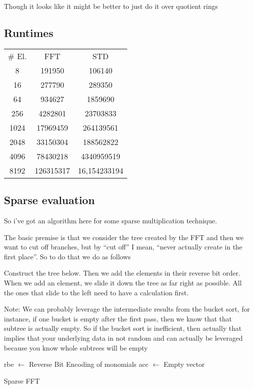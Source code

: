 Though it looks like it might be better to just do it over quotient rings

\subsection{Runtimes}

\begin{center}
    \begin{tabular}{|c| c c|}
        \# El. & FFT & STD\\
        8      & 191950 & 106140 \\
        16     & 277790 & 289350 \\
        64     & 934627 & 1859690 \\
        256    & 4282801 & 23703833 \\
        1024   & 17969459 & 264139561 \\
        2048   & 33150304 & 188562822 \\
        4096   & 78430218 & 4340959519 \\
        8192   & 126315317 & 16,154233194 \\
    \end{tabular}
\end{center}

\subsection{Sparse evaluation}

So i've got an algorithm here for some sparse multiplication technique.

The basic premise is that we consider the tree created by the FFT and then we want to cut off branches, but by ``cut off'' I mean, ``never actually create in the first place''. So to do that we do as follows

Construct the tree below.
Then we add the elements in their reverse bit order. When we add an element, we slide it down the tree as far right as possible. All the ones that slide to the left need to have a calculation first.

Note: We can probably leverage the intermediate results from the bucket sort, for instance, if one bucket is empty after the first pass, then we know that that subtree is actually empty. So if the bucket sort is inefficient, then actually that implies that your underlying data in not random and can actually be leveraged because you know whole subtrees will be empty

\begin{algorithm}[H]
  \SetAlgoLined
  rbe $\gets$ Reverse Bit Encoding of monomials\;
  acc $\gets$ Empty vector\; 
  \caption{Sparse FFT}
\end{algorithm}


